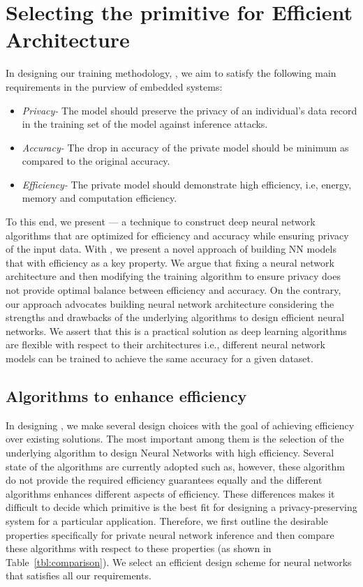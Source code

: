 \section{Selecting the primitive for Efficient Architecture}

In designing our training methodology, \method, we aim to satisfy the following main requirements in the purview of embedded systems:

\begin{itemize}
\item {\em Privacy-}
The model should preserve the privacy of an individual's data record in the training set of the model against inference attacks.

\item {\em Accuracy-}
The drop in accuracy of the private model should be minimum as compared to the original accuracy.

\item {\em Efficiency-}
The private model should demonstrate high efficiency, i.e, energy, memory and computation efficiency.
\end{itemize}

To this end, we present \method --- a technique to construct deep neural network algorithms that are optimized for efficiency and accuracy while ensuring privacy of the input data.
With \method, we present a novel approach of building NN models that with efficiency as a key property.
We argue that fixing a neural network architecture and then modifying the training algorithm to ensure privacy does not provide optimal balance between efficiency and accuracy.
On the contrary, our approach advocates building neural network architecture considering the strengths and drawbacks of the underlying algorithms to design efficient neural networks.
We assert that this is a practical solution as deep learning algorithms are flexible with respect to their architectures i.e., different neural network models can be trained to achieve the same accuracy for a given dataset.



\subsection{Algorithms to enhance efficiency}

In designing \method, we make several design choices with the goal of achieving efficiency over existing solutions.
The most important among them is the selection of the underlying algorithm to design Neural Networks with high efficiency.
Several state of the algorithms are currently adopted such as, however, these algorithm do not provide the required efficiency guarantees equally and the different algorithms enhances different aspects of efficiency.
These differences makes it difficult to decide which primitive is the best fit for designing a privacy-preserving system for a particular application.
Therefore, we first outline the desirable properties specifically for private neural network inference and then compare these algorithms with respect to these properties (as shown in Table~\ref{tbl:comparison}).
We select an efficient design scheme for neural networks that satisfies all our requirements.

